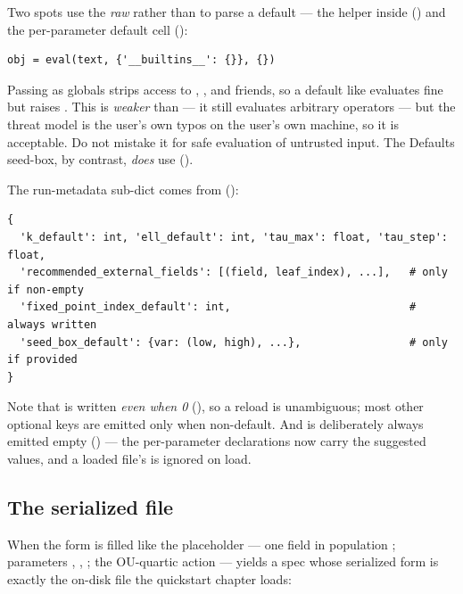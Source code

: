 \begin{gotcha}
Two spots use the \emph{raw}  rather than  to
parse a default --- the  helper inside 
() and the per-parameter default cell
():
\begin{lstlisting}
obj = eval(text, {'__builtins__': {}}, {})
\end{lstlisting}
Passing  as globals strips access to
, , and friends, so a default like
\code{[[1,0],[0,1]]} evaluates fine but  raises
. This is \emph{weaker} than  --- it still
evaluates arbitrary operators --- but the threat model is the user's own typos on
the user's own machine, so it is acceptable. Do not mistake it for safe evaluation
of untrusted input. The Defaults seed-box, by contrast, \emph{does} use
 ().
\end{gotcha}

The run-metadata sub-dict comes from 
():

\begin{lstlisting}
{
  'k_default': int, 'ell_default': int, 'tau_max': float, 'tau_step': float,
  'recommended_external_fields': [(field, leaf_index), ...],   # only if non-empty
  'fixed_point_index_default': int,                            # always written
  'seed_box_default': {var: (low, high), ...},                 # only if provided
}
\end{lstlisting}

Note that  is written \emph{even when 0}
(), so a reload is unambiguous; most other optional
keys are emitted only when non-default. And  is
deliberately always emitted empty () --- the
per-parameter  declarations now carry the suggested values, and a
loaded file's  is ignored on load.

\subsection{The serialized file}

When the form is filled like the placeholder --- one field  in population
; parameters , , ; the OU-quartic action ---
 yields a spec whose serialized form is exactly the on-disk file
the quickstart chapter loads:

